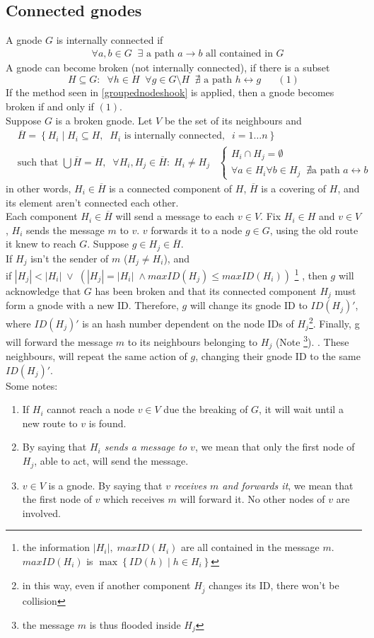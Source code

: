 \documentclass[a4paper]{article}
\newcommand{\T}[1]{\textrm{#1}}
\newcommand{\pgra}[1]{\left\{#1\right\}}
\newcommand{\sist}[1]{{ \begin{cases} #1 \end{cases} }}
\newcommand{\eal}[1]{{\begin{align*} #1 \end{align*}}}
\def\ove#1{{\overline{#1}}}
\def\-{{\setminus}}
\def\0{{\emptyset}}
\def\^{{\cap}}
\def\({{\subseteq}}
\def\'{{\;\;\;}}
\begin{document}
\subsection{Connected gnodes}
A gnode $G$ is internally connected if
\eal{&\forall a,b\in G\;\;\exists \T{ a path $a\rightarrow b$ all contained in $G$}}
A gnode can become broken (not internally connected), if there is a subset \[H\(
G:\;\;\forall h\in H\;\;\forall g\in G\-H\;\;\nexists \T{ a path $h\leftrightarrow
g$}\'\'(1)\]
If the method seen in \ref{groupednodeshook} is applied, then a gnode becomes
broken if and only if $(1)$.\\
\newline
Suppose $G$ is a broken gnode.
Let $V$ be the set of its neighbours and 
\eal{&\ove H=\pgra{H_i\;|\;H_i\( H,\;\;H_i\T{ is internally connected
},\;\;i=1\dots n}\\
&\T{such that } \bigcup \ove H = H,\;\;\forall H_i,H_j\in \ove H:\;H_i\neq
H_j \' \sist{H_i\^H_j=\0\\
\forall a\in H_i\forall b\in H_j\;\;\nexists \T{
a path $a\leftrightarrow b$}}
}
in other words, $H_i\in \ove H$ is a connected component of $H$, $\ove H$
is a covering of $H$, and its element aren't connected each other.\\
Each component $H_i\in \ove H$ will send a message to each $v\in V$. Fix
$H_i\in H$ and $v\in V$, $H_i$ sends the message $m$ to $v$. $v$ forwards it
to a node $g\in G$, using the old route it knew to reach $G$. 
Suppose $g\in H_j\in \ove H$.\\
If $H_j$ isn't the sender of $m$ ($H_j\neq H_i$), and \\if
$|H_j| < |H_i|\;\lor \;(|H_j|=|H_i|\;\land maxID(H_j) \le maxID(H_i))$
\footnote{the information $|H_i|,\;maxID(H_i)$ are all contained in the
message $m$. $maxID(H_i)$ is $\max\pgra{ID(h)\;|\;h\in H_i}$}
, then
$g$ will acknowledge that $G$ has been broken and that its connected component
$H_j$ must form a gnode with a new ID. Therefore, $g$ will change its gnode ID
to $ID(H_j)'$, where $ID(H_j)'$ is an hash number dependent on the node IDs of
$H_j$\footnote{in this way, even if another component $H_{\ove j}$ changes its ID,
there won't be collision}. Finally, g will forward the message $m$ to its neighbours
belonging to $H_j$
(Note \footnote{the message $m$ is thus flooded inside $H_j$}).
. These neighbours, will repeat the same action of $g$, changing their gnode
ID to the same $ID(H_j)'$.\\
\newline
Some notes:
\begin{enumerate}
	\item If $H_i$ cannot reach a node $v\in V$ due the breaking of $G$, it will
		wait until a new route to $v$ is found.\\
	\item By saying that \emph{$H_i$ sends a message to $v$}, we mean that only the
		first node of $H_j$, able to act, will send the message.
	\item $v\in V$ is a gnode. By saying that \emph{$v$ receives $m$ and
		forwards it}, we mean that the first node of $v$ which receives $m$ will
		forward it. No other nodes of $v$ are involved.
\end{enumerate}
\end{document}
